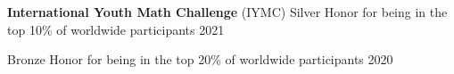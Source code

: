 \begin{entry}{{\bf International Youth Math Challenge} (IYMC)}{}
	Silver Honor for being in the top 10\% of worldwide participants \hfill 2021

	Bronze Honor for being in the top 20\% of worldwide participants \hfill 2020
	
\end{entry}

